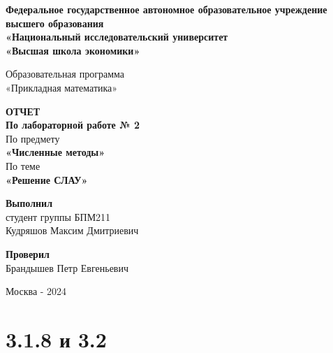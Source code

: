 \documentclass[a4paper,11pt]{article}
\theoremstyle{definition} %
\theoremstyle{remark} %
\begin{document}
\begin{titlepage} %
\pagestyle{empty}
\begin{center}

\Large
\textbf{Федеральное государственное автономное образовательное учреждение высшего образования\\
«Национальный исследовательский университет\\
«Высшая школа экономики»}\\
\vspace{5mm}

\Large
Образовательная программа \\
«Прикладная математика»
\vspace{40mm}

\Large
\textbf{ОТЧЕТ} \\
\textbf{По лабораторной работе № 2} \\
\vspace{5mm}
\Large По предмету \\
\LARGE\textbf{«Численные методы»} \\
\vspace{5mm}
\Large По теме \\
\LARGE\textbf{«Решение СЛАУ»}
\end{center}

\begin{center}
\vfill

\large
\begin{flushright}
\textbf{Выполнил} \\
студент группы БПМ211 \\
Кудряшов Максим Дмитриевич \\
\end{flushright}

\large
\begin{flushright}
\textbf{Проверил} \\
Брандышев Петр Евгеньевич \\
\end{flushright}

\large
\vspace{20mm}
Москва - 2024
\end{center}
\end{titlepage} %

\newpage
\tableofcontents
\newpage

\section{3.1.8 и 3.2}
\end{document}
